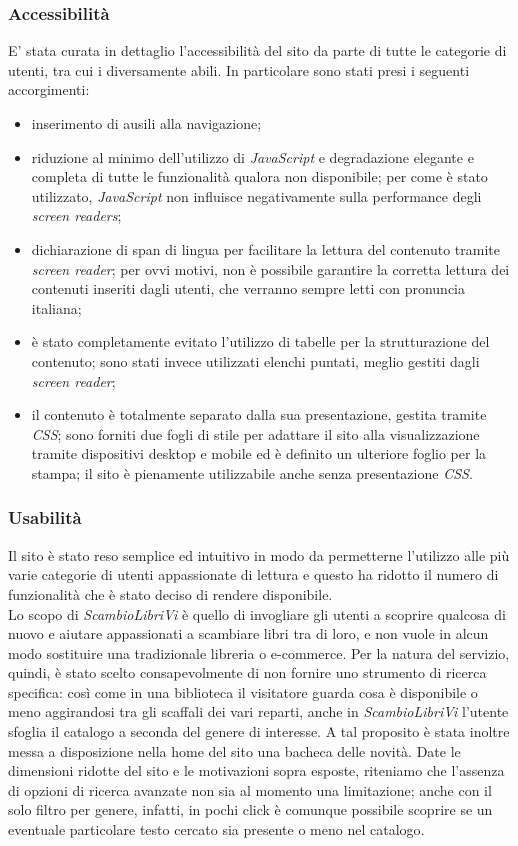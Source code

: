 \documentclass[openany,10pt,a4paper]{article}
\begin{document}
		\subsubsection{Accessibilità}
		E' stata curata in dettaglio l'accessibilità del sito da parte di tutte le categorie di utenti, tra cui i diversamente abili. In particolare sono stati presi i seguenti accorgimenti:
			\begin{itemize}
				\item inserimento di ausili alla navigazione;
				\item riduzione al minimo dell'utilizzo di \textit{JavaScript} e degradazione elegante e completa di tutte le funzionalità qualora non disponibile; per come è stato utilizzato, \textit{JavaScript} non influisce negativamente sulla performance degli \textit{screen readers};
				\item dichiarazione di span di lingua per facilitare la lettura del contenuto tramite \textit{screen reader}; per ovvi motivi, non è possibile garantire la corretta lettura dei contenuti inseriti dagli utenti, che verranno sempre letti con pronuncia italiana;
				\item è stato completamente evitato l'utilizzo di tabelle per la strutturazione del contenuto; sono stati invece utilizzati elenchi puntati, meglio gestiti dagli \textit{screen reader};
				\item il contenuto è totalmente separato dalla sua presentazione, gestita tramite \textit{CSS}; sono forniti due fogli di stile per adattare il sito alla visualizzazione tramite dispositivi desktop e mobile ed è definito un ulteriore foglio per la stampa; il sito è pienamente utilizzabile anche senza presentazione \textit{CSS}.
			\end{itemize}
		\subsubsection{Usabilità}
		Il sito è stato reso semplice ed intuitivo in modo da permetterne l'utilizzo alle più varie categorie di utenti appassionate di lettura e questo ha ridotto il numero di funzionalità che è stato deciso di rendere disponibile. \\ 
		Lo scopo di \textit{ScambioLibriVi} è quello di invogliare gli utenti a scoprire qualcosa di nuovo e aiutare appassionati a scambiare libri tra di loro, e non vuole in alcun modo sostituire una tradizionale libreria o e-commerce.
		Per la natura del servizio, quindi, è stato scelto consapevolmente di non fornire uno strumento di ricerca specifica: così come in una biblioteca il visitatore guarda cosa è disponibile o meno aggirandosi tra gli scaffali dei vari reparti, anche in \textit{ScambioLibriVi} l'utente sfoglia il catalogo a seconda del genere di interesse. 
			A tal proposito è stata inoltre messa a disposizione nella home del sito una bacheca delle novità.
		Date le dimensioni ridotte del sito e le motivazioni sopra esposte, riteniamo che l'assenza di opzioni di ricerca avanzate non sia al momento una limitazione; anche con il solo filtro per genere, infatti, in pochi click è comunque possibile scoprire se un eventuale particolare testo cercato sia presente o meno nel catalogo.
	
\end{document}
